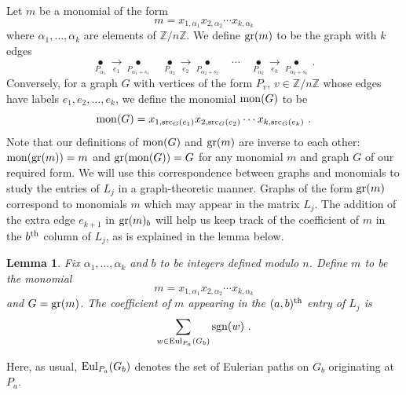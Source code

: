 \documentclass{amsproc}
\newtheorem{lemma}[theorem]{Lemma}
\theoremstyle{definition}
\theoremstyle{remark}
\numberwithin{equation}{section}
\newcommand{\Z}{{\mathbb Z}}
\newcommand{\bbZ}{{\mathbb Z}}
\newcommand{\sgn}{{\rm sgn}}
\newcommand{\gr}{{\rm gr}}
\newcommand{\mon}{{\rm mon}}
\newcommand{\src}{{\rm src}}
\newcommand{\uni}{{\rm Eul}}
\begin{document}
Let $m$ be a monomial of the form
\[m=x_{1,\alpha_1}x_{2,\alpha_2}\cdots x_{k,\alpha_k}\]
where $\alpha_1,\dots,\alpha_k$ are elements of $\Z/n\Z$. We define $\gr(m)$ to be the graph with $k$ edges 
\begin{equation}\label{gr_m}
\underset {P_{\alpha_1}} \bullet \underset {e_{1}} \longrightarrow \underset {P_{\alpha_1+s_1}} \bullet
\quad
\underset {P_{\alpha_2}} \bullet \underset {e_{2}} \longrightarrow \underset {P_{\alpha_2+s_{2}}} \bullet
\quad\cdots\quad
\underset {P_{\alpha_k}} \bullet \underset {e_{k}} \longrightarrow \underset {P_{\alpha_k + s_{k}}} \bullet\ .
\end{equation}
Conversely, for a graph $G$ with vertices of the form $P_v$, $v \in \bbZ/ n \bbZ$ 
whose edges have labels $e_{1},e_{2},\dots,e_{k}$, we define the monomial $\mon(G)$ to be
\begin{equation}\label{mon_G}
\mon(G)=x_{1,\src_G(e_{1})}x_{2,\src_G(e_{2})}\cdots x_{k,\src_G(e_{k})}\ .
\end{equation}
Note that our definitions of $\mon(G)$ and $\gr(m)$ are inverse to each other: $\mon(\gr(m))=m$ and $\gr(\mon(G))=G$ for any monomial $m$ and graph $G$ of our required form. We will use this correspondence between graphs and monomials to study the entries of $L_j$ in a graph-theoretic manner.
Graphs of the form $\gr(m)$ correspond to monomials $m$ which may appear 
in the matrix $L_j$. The addition of the extra edge $e_{k+1}$ in $\gr(m)_b$ will help us keep track of the coefficient of $m$ 
in the $b^{\rm th}$ column of $L_j$, as is explained in the lemma below.

\begin{lemma}\label{matrix_from_graph}
Fix $\alpha_1,\dots,\alpha_k$ and $b$ to be integers defined modulo $n$. Define $m$ to be the monomial
\[m=x_{1,\alpha_1}x_{2,\alpha_2}\cdots x_{k,\alpha_k}\]
and $G=\gr(m)$.
The coefficient of $m$ appearing in the $(a,b)^{\rm th}$ entry of $L_j$ is
\[\sum_{w\in \uni_{P_a}(G_b)}\sgn(w)\ .\]
\end{lemma}

Here, as usual, $\uni_{P_a}(G_b)$ denotes the set of Eulerian paths on $G_b$ originating at $P_a$.
\end{document}
